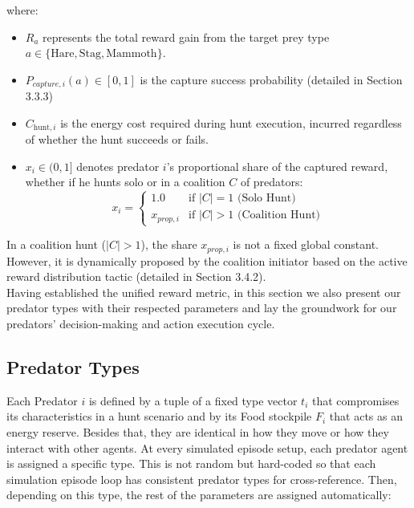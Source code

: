 \documentclass[12pt,a4paper]{report}
\begin{document}
	where:
	\begin{itemize}
		\item $R_a$ represents the total reward gain from the target prey type $a \in \{\text{Hare}, \text{Stag}, \text{Mammoth}\}$.
		\item $P_{capture,i}(a) \in [0, 1]$ is the capture success probability (detailed in Section 3.3.3)
		\item $C_{\text{hunt},i}$ is the energy cost required during hunt execution, incurred regardless of whether the hunt succeeds or fails.
		\item $x_i \in (0, 1]$ denotes predator $i$'s proportional share of the captured reward, whether if he hunts solo or in a coalition $C$ of predators:
		\begin{equation} \label{eq:proposed_share}
			x_i = \begin{cases} 
				1.0 & \text{if } |C| = 1 \text{ (Solo Hunt)} \\[4pt]
				x_{prop, i} & \text{if } |C| > 1 \text{ (Coalition Hunt)} 
			\end{cases}
		\end{equation}
	\end{itemize}
	
	In a coalition hunt ($|C| > 1$), the share $x_{prop, i}$ is not a fixed global constant. However, it is dynamically proposed by the coalition initiator based on the active reward distribution tactic (detailed in Section 3.4.2). \\
	
	Having established the unified reward metric, in this section we also present our predator types with their respected parameters and lay the groundwork for our predators' decision-making and action execution cycle.
	
	\subsection{Predator Types}
	
	Each Predator $i$ is defined by a tuple of a fixed type vector $t_{i}$ that compromises its characteristics in a hunt scenario and by its Food stockpile $F_{i}$ that acts as an energy reserve. Besides that, they are identical in how they move or how they interact with other agents. At every simulated episode setup, each predator agent is assigned a specific type. This is not random but hard-coded so that each simulation episode loop has consistent predator types for cross-reference. Then, depending on this type, the rest of the parameters are assigned automatically:
	
\end{document}
